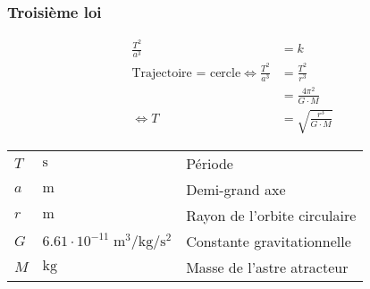 \documentclass{article}
\newcommand{\deftable}[2]{%
\begin{table}[h]
    \centering
    \begin{tabular}{llp{100mm}}%
        #1
    \end{tabular}
    \label{tab:#2_units}
\end{table}%
}
\newcommand{\deftablevar}[3]{%
    $#1$ & $\si{#2}$ & #3 \\
}
\begin{document}
\subsubsection{Troisième loi}

\begin{equation*}
    \begin{split}
        \frac{T^2}{a^3} &= k \\
        \text{Trajectoire = cercle} \iff \frac{T^2}{a^3} &= \frac{T^2}{r^3} \\
        &= \frac{4\pi^2}{G\cdot M} \\
        \iff T &= \sqrt{\frac{r^3}{G\cdot M}}
    \end{split}
\end{equation*}

\deftable{
    \deftablevar{T}{\second}{Période}
    \deftablevar{a}{\meter}{Demi-grand axe}
    \deftablevar{r}{\meter}{Rayon de l'orbite circulaire}
    \deftablevar{G}{6.61\cdot10^{-11}\;\meter\cubed\per\kilo\gram\per\second\squared}{Constante gravitationnelle}
    \deftablevar{M}{\kilo\gram}{Masse de l'astre atracteur}
}{troisieme_loi_kepler}
\end{document}
